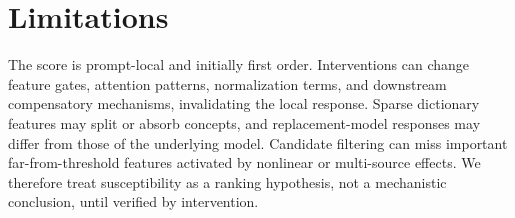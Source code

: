 \section{Limitations}
\label{sec:limitations}

The score is prompt-local and initially first order. Interventions can change feature gates, attention patterns, normalization terms, and downstream compensatory mechanisms, invalidating the local response. Sparse dictionary features may split or absorb concepts, and replacement-model responses may differ from those of the underlying model. Candidate filtering can miss important far-from-threshold features activated by nonlinear or multi-source effects. We therefore treat susceptibility as a ranking hypothesis, not a mechanistic conclusion, until verified by intervention.
